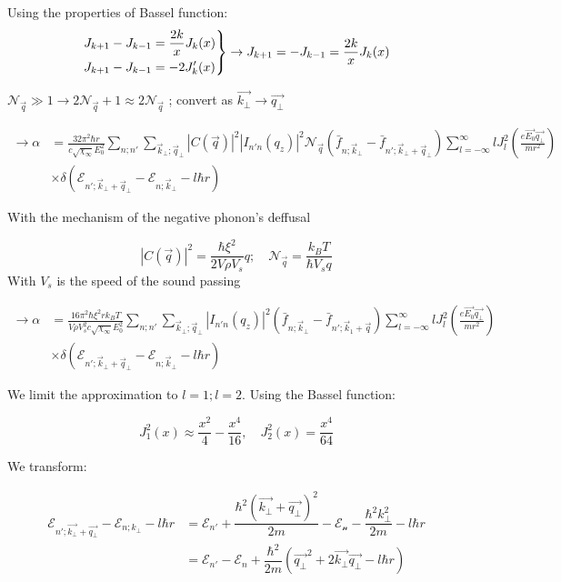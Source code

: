 \documentclass{article}
\begin{document}
Using the properties of Bassel function: 
$$\left. \begin{aligned}
J_{k+1} - J_{k-1} &= \frac{2k}{x} J_k(x) \\
J_{k+1} - J_{k-1} &= -2 J'_k(x)
\end{aligned} \right\} \rightarrow J_{k+1} = -J_{k-1} = \frac{2k}{x} J_k(x) \\$$

$\mathcal{N}_{\vec{q}} \gg 1 \rightarrow 2\mathcal{N}_{\vec{q}} + 1 \approx 2\mathcal{N}_{\vec{q}}$ ; convert as $\vec{k_\bot}\to \vec{q_\bot}$


%



\begin{align*}
    \rightarrow \alpha &= \frac{32 \pi^2 \hbar r}{c \sqrt{\chi_\infty} E_0^2} \sum_{n;n'} \sum_{\vec{k}_\bot; \vec{q}_\bot} |C(\vec{q})|^2 |I_{n'n}(q_z)|^2 \mathcal{N}_{\vec{q}} (\bar{f}_{n; \vec{k}_\bot} - \bar{f}_{n'; \vec{k}_\bot+\vec{q}_\bot}) \sum_{l=-\infty}^{\infty} l J_l^2 \left( \frac{e \vec{E_0} \vec{q_\bot}}{m r^2} \right) \\
&\times \delta(\mathcal{E}_{n'; \vec{k}_\bot+\vec{q}_\bot} - \mathcal{E}_{n; \vec{k}_\bot} - l \hbar r)
\end{align*}

With the mechanism of the negative phonon's deffusal

$$|C(\vec{q})|^2 = \frac{\hbar \xi 
^2}{2 V \rho V_s} q ; \quad \mathcal{N}_{\vec{q}} = \frac{k_B T}{\hbar V_s q}$$
With $V_s$ is the speed of the sound passing 

\begin{align*}
   \to \alpha &= \frac{16 \pi^2 \hbar \xi^2 r k_B T}{V \rho V_s^2 c \sqrt{\chi_\infty} E_0^2} \sum_{n;n'} \sum_{\vec{k}_\bot; \vec{q}_\bot} |I_{n'n}(q_z)|^2 (\bar{f}_{n; \vec{k}_\bot} - \bar{f}_{n'; \vec{k}_1+\vec{q}}) \sum_{l=-\infty}^{\infty} l J_l^2 \left( \frac{e \vec{E_0} \vec{q_\bot}}{m r^2} \right) \\
&\times \delta(\mathcal{E}_{n'; \vec{k}_\bot+\vec{q}_\bot} - \mathcal{E}_{n; \vec{k}_\bot} - l \hbar r)
\end{align*}

We limit the approximation to $l=1; l=2$. Using the Bassel function:

$$J_1^2(x) \approx \frac{x^2}{4} - \frac{x^4}{16}, \quad J_2^2(x) = \frac{x^4}{64}$$

We transform:

\begin{align*}
    \mathcal{E}_{n';\vec{k_\bot}+\vec{q_\bot}}- \mathcal{E}_{n;k_\bot}-l\hbar r & = \mathcal{E}_{n'}+ \dfrac{\hbar^2(\vec{k_\bot}+\vec{q_\bot})^2}{2m}-\mathcal{E_n}-\dfrac{\hbar^2 k_\bot^2}{2m}-l\hbar r\\
    & = \mathcal{E}_{n'} - \mathcal{E}_n + \dfrac{\hbar^2}{2m}\left( \vec{q_\bot}^2 + 2\vec{k_\bot}\vec{q_\bot} - l \hbar r\right)
\end{align*}
\end{document}
